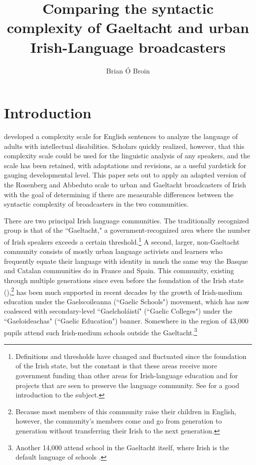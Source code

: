 \documentclass[output=paper,colorlinks,citecolor=brown]{langscibook}
\title{Comparing the syntactic complexity of Gaeltacht and urban Irish-Language broadcasters}
\author{Brian Ó Broin\affiliation{William Paterson University, NJ}}
\begin{document}
\maketitle

\section{Introduction}

\citet{ob:RosenbergAbbeduto1987} developed a complexity scale for English sentences to analyze the language of adults with intellectual disabilities. Scholars quickly realized, however, that this complexity scale could be used for the linguistic analysis of any speakers, and the scale has been retained, with adaptations and revisions, as a useful yardstick for gauging  developmental level. This paper sets out to apply an adapted version of the Rosenberg and Abbeduto scale to urban and Gaeltacht broadcasters of Irish with the goal of determining if there are measurable differences between the syntactic complexity of broadcasters in the two communities.

There are two principal Irish language communities. The traditionally recognized group is that of the ``Gaeltacht," a government-recognized area where the number of Irish speakers exceeds a certain threshold.\footnote{Definitions and thresholds have changed and fluctuated since the foundation of the Irish state, but the constant is that these areas receive more government funding than other areas for Irish-language education and for projects that are seen to preserve the language community. See
\citet{ob:OGadhra} for a good introduction to the subject.} A second, larger, non-Gaeltacht community consists of mostly urban language activists and learners who frequently equate their language with identity in much the same way the Basque and Catalan communities do in France and Spain. This community, existing through multiple generations since even before the foundation of the Irish state  (\cite{ob:Edwards2016}),\footnote{Because most members of this community raise their children in English, however, the community's members come and go from generation to generation without transferring their Irish to the next generation.} has been much supported in recent decades by the growth of Irish-medium education under the Gaelscoileanna (``Gaelic Schools") movement, which has now coalesced with secondary-level ``Gaelcholáistí" (``Gaelic Colleges") under the ``Gaeloideachas" (``Gaelic Education") banner. Somewhere in the region of 43,000 pupils attend such Irish-medium schools outside the Gaeltacht.\footnote{Another 14,000 attend school in the Gaeltacht itself, where Irish is the default language of schools \citep{ob:Gaeloideachas2023}.}
\end{document}
